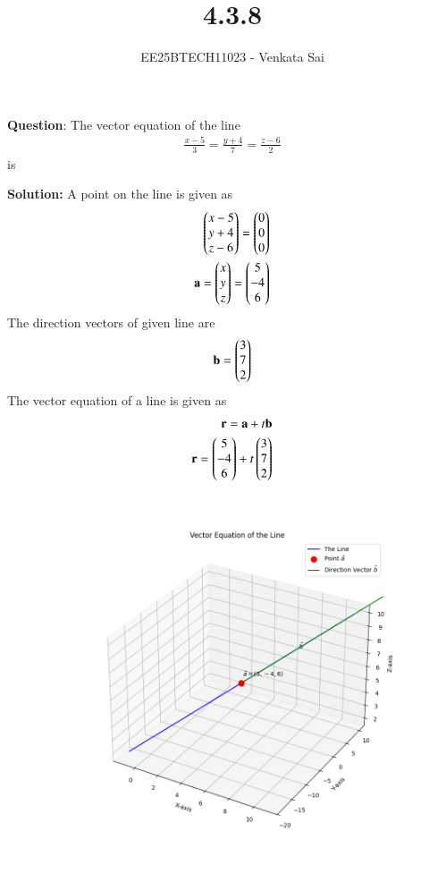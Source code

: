 \documentclass[journal]{IEEEtran}
\begin{document}


\title{4.3.8}
\author{EE25BTECH11023 - Venkata Sai}
{\let\newpage\relax\maketitle}

\renewcommand{\thefigure}{\theenumi}
\renewcommand{\thetable}{\theenumi}
\setlength{\intextsep}{10pt} %


\renewcommand{\thetable}{\theenumi}


\textbf{Question}:\newline
The vector equation of the line
\begin{align}
\frac{x-5}{3} = \frac{y+4}{7} = \frac{z-6}{2}
\end{align}
is

\textbf{Solution: }
A point on the line  is given as
\begin{align}
\begin{pmatrix}x-5 \\y+4 \\z-6\end{pmatrix}=\begin{pmatrix}0\\0\\0\end{pmatrix}\\
\mathbf{a}=\begin{pmatrix}x\\y\\z\end{pmatrix}=\begin{pmatrix}5\\-4\\6\end{pmatrix}
\end{align}
The direction vectors of given line are
\begin{align}
    \mathbf{b}=\begin{pmatrix}3\\7\\2\end{pmatrix}
\end{align}
The vector equation of a line is given as
\begin{align}
    \mathbf{r}=\mathbf{a}+t\mathbf{b} \\
    \mathbf{r}=\begin{pmatrix}5\\-4\\6\end{pmatrix}+t\begin{pmatrix}3\\7\\2\end{pmatrix}
\end{align}

\begin{figure}[h!]
   \centering
   \includegraphics[width=0.7\columnwidth]{figs/fig1.png}
   \caption{}
   \label{Figure}
\end{figure}
\end{document}
